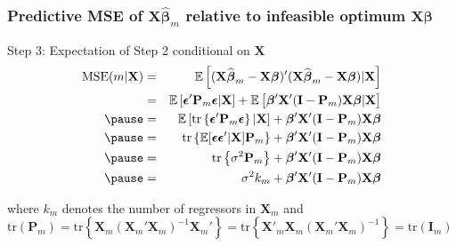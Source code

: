 \begin{frame}
  \frametitle{Predictive MSE of $\mathbf{X}\widehat{\boldsymbol{\beta}}_m$ relative to infeasible optimum $\boldsymbol{X}\boldsymbol{\beta}$}
  \begin{block}{Step 3: Expectation of Step 2 conditional on $\mathbf{X}$}
	\begin{eqnarray*}
    \mbox{MSE}(m|\mathbf{X}) &=& \mathbb{E}\left[(\mathbf{X}\widehat{\boldsymbol{\beta}}_m - \mathbf{X}\boldsymbol{\beta})'(\mathbf{X}\widehat{\boldsymbol{\beta}}_m - \mathbf{X}\boldsymbol{\beta})|\mathbf{X} \right]\\
    &=& \mathbb{E}\left[\boldsymbol{\epsilon}'\mathbf{P}_m \boldsymbol{\epsilon}|\mathbf{X}\right] + \mathbb{E}\left[\boldsymbol{\beta}'\mathbf{X}'(\mathbf{I} - \mathbf{P}_m)\mathbf{X}\boldsymbol{\beta} |\mathbf{X}\right]\\ \pause
    &=&\mathbb{E}\left[\mbox{tr}\left\{\boldsymbol{\epsilon}'\mathbf{P}_m \boldsymbol{\epsilon}\right\}|\mathbf{X}\right] + \boldsymbol{\beta}'\mathbf{X}'(\mathbf{I} - \mathbf{P}_m)\mathbf{X}\boldsymbol{\beta} \\ \pause
    &=&\mbox{tr}\left\{\mathbb{E}[\boldsymbol{\epsilon} \boldsymbol{\epsilon}'|\mathbf{X}]\mathbf{P}_m\right\} + \boldsymbol{\beta}'\mathbf{X}'(\mathbf{I} - \mathbf{P}_m)\mathbf{X}\boldsymbol{\beta} \\ \pause
    &=&\mbox{tr}\left\{\sigma^2 \mathbf{P}_m\right\} + \boldsymbol{\beta}'\mathbf{X}'(\mathbf{I} - \mathbf{P}_m)\mathbf{X}\boldsymbol{\beta} \\ \pause
    &=& \sigma^2 k_m + \boldsymbol{\beta}'\mathbf{X}'(\mathbf{I} - \mathbf{P}_m)\mathbf{X}\boldsymbol{\beta}
	\end{eqnarray*}

  \vspace{1em}
  \small
  \alert{where $k_m$ denotes the number of regressors in $\mathbf{X}_m$ and $\text{tr}(\mathbf{P}_m) = \text{tr}\left\{ \mathbf{X}_m\left( \mathbf{X}_m'\mathbf{X}_m \right)^{-1}\mathbf{X}_m' \right\} = \text{tr}\left\{ \mathbf{X}'_m \mathbf{X}_m \left( \mathbf{X}_m' \mathbf{X}_m \right)^{-1} \right\} = \text{tr}(\mathbf{I}_m)$}
  \end{block}

\end{frame}
